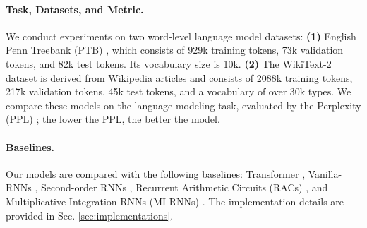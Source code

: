 \documentclass{article}
\theoremstyle{plain}
\theoremstyle{definition}
\theoremstyle{remark}
\begin{document}
\paragraph{Task, Datasets, and Metric.}  We conduct experiments on two word-level language model datasets: \textbf{(1)} English Penn Treebank (PTB) \citep{marcinkiewicz1994building}, which consists of 929k training tokens, 73k validation tokens, and 82k test tokens. Its vocabulary size is 10k. \textbf{(2)} The WikiText-2 dataset \citep{merity2016pointer} is derived from Wikipedia articles and consists of 2088k training tokens, 217k validation tokens, 45k test tokens, and a vocabulary of over 30k types. We compare these models on the language modeling task,  evaluated by the Perplexity (PPL) \citep{meister-cotterell-2021-language}; the lower the PPL, the better the model.


\paragraph{Baselines.} Our models are compared with the following baselines: 
  Transformer \citep{vaswani2017attention} ,  Vanilla-RNNs \citep{mikolov2012context},     Second-order RNNs \citep{hochreiter1997long}, Recurrent Arithmetic Circuits (RACs)   \citep{levine2018benefits}, and   Multiplicative Integration RNNs (MI-RNNs) \citep{wu_multiplicative_2016}. The implementation details are provided in Sec. \ref{sec:implementations}.





\end{document}
